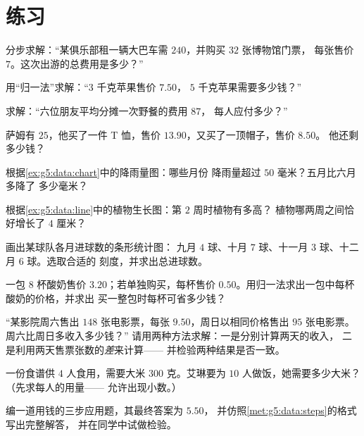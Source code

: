 \section{练习}

\begin{exercise}[$\star$]\label{exo:g5:data:1}
分步求解：“某俱乐部租一辆大巴车需 $240$，并购买 $32$ 张博物馆门票，
每张售价 $7$。这次出游的总费用是多少？”
\end{exercise}

\begin{exercise}[$\star$]\label{exo:g5:data:2}
用“归一法”求解：“$3$ 千克苹果售价 $7.50$，
$5$ 千克苹果需要多少钱？”
\end{exercise}

\begin{exercise}[$\star$]\label{exo:g5:data:3}
求解：“六位朋友平均分摊一次野餐的费用 $87$，
每人应付多少？”
\end{exercise}

\begin{exercise}[$\star$]\label{exo:g5:data:4}
萨姆有 $25$，他买了一件 T 恤，售价 $13.90$，又买了一顶帽子，售价 $8.50$。
他还剩多少钱？
\end{exercise}

\begin{exercise}[$\star$]\label{exo:g5:data:5}
根据\cref{ex:g5:data:chart}中的降雨量图：哪些月份
降雨量超过 $50$ 毫米？五月比六月多降了
多少毫米？
\end{exercise}

\begin{exercise}[$\star$]\label{exo:g5:data:6}
根据\cref{ex:g5:data:line}中的植物生长图：第 $2$ 周时植物有多高？
植物哪两周之间恰好增长了
$4$ 厘米？
\end{exercise}

\begin{exercise}[$\star$]\label{exo:g5:data:7}
画出某球队各月进球数的条形统计图：
九月 $4$ 球、十月 $7$ 球、十一月 $3$ 球、十二月 $6$ 球。选取合适的
刻度，并求出总进球数。
\end{exercise}

\begin{exercise}[$\star$]\label{exo:g5:data:8}
一包 $8$ 杯酸奶售价 $3.20$；若单独购买，每杯售价
$0.50$。用归一法求出一包中每杯酸奶的价格，并求出
买一整包时每杯可省多少钱？
\end{exercise}

\begin{exercise}[$\star\star$]\label{exo:g5:data:9}
“某影院周六售出 $148$ 张电影票，每张 $9.50$，周日以相同价格售出 $95$ 张电影票。
周六比周日多收入多少钱？”
请用两种方法求解：一是分别计算两天的收入，
二是利用两天售票张数的\emph{差}来计算——
并检验两种结果是否一致。
\end{exercise}

\begin{exercise}[$\star\star$]\label{exo:g5:data:10}
一份食谱供 $4$ 人食用，需要大米 $300$ 克。艾琳要为
$10$ 人做饭，她需要多少大米？（先求每人的用量——
允许出现小数。）
\end{exercise}

\begin{exercise}[$\star\star$]\label{exo:g5:data:11}
编一道用钱的三步应用题，其最终答案为 $5.50$，
并仿照\cref{met:g5:data:steps}的格式写出完整解答，
并在同学中试做检验。
\end{exercise}
